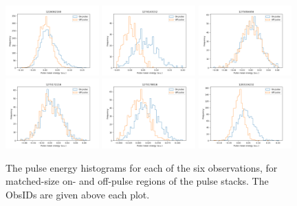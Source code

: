 \documentclass[linenumbers]{aastex631}
\begin{document}
\begin{figure}[t]
    \includegraphics[width=0.32\textwidth]{1226062160_nullhist.png}
    \includegraphics[width=0.32\textwidth]{1274143152_nullhist.png}
    \includegraphics[width=0.32\textwidth]{1275094456_nullhist.png} \\
    \includegraphics[width=0.32\textwidth]{1275172216_nullhist.png}
    \includegraphics[width=0.32\textwidth]{1275178816_nullhist.png}
    \includegraphics[width=0.32\textwidth]{1283104232_nullhist.png}
    \caption{The pulse energy histograms for each of the six observations, for matched-size on- and off-pulse regions of the pulse stacks. The ObsIDs are given above each plot.}
    \label{fig:nullhist}
\end{figure}
\end{document}
